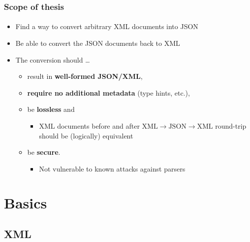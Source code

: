\documentclass[
    alternativetitlepage=alternativ,
    cornerlogo=hgi_nds_logo2,
    sectionoverview,
]{rubpresentation}
\begin{document}
\begin{frame}
    \frametitle{Scope of thesis}
    \framesubtitle{}
    \begin{itemize}
        \item{} Find a way to convert arbitrary XML documents into JSON\\
        \item{} Be able to convert the JSON documents back to XML\\
        \item{} The conversion should \ldots\
            \begin{itemize}
                \item{} result in \textbf{well-formed JSON/XML},
                \item{} \textbf{require no additional metadata} (type hints, etc.),\\
                \item{} be \textbf{lossless} and
                    \begin{itemize}
                        \item{} XML documents before and after %
                                $\text{XML}\rightarrow\text{JSON}\rightarrow\text{XML}$ %
                                round-trip should be (logically) equivalent\\
                    \end{itemize}
                \item{} be \textbf{secure}.
                    \begin{itemize}
                        \item{} Not vulnerable to known attacks against parsers\\
                    \end{itemize}
            \end{itemize}
    \end{itemize}
\end{frame}


\section{Basics}

\subsection{XML}
\end{document}
